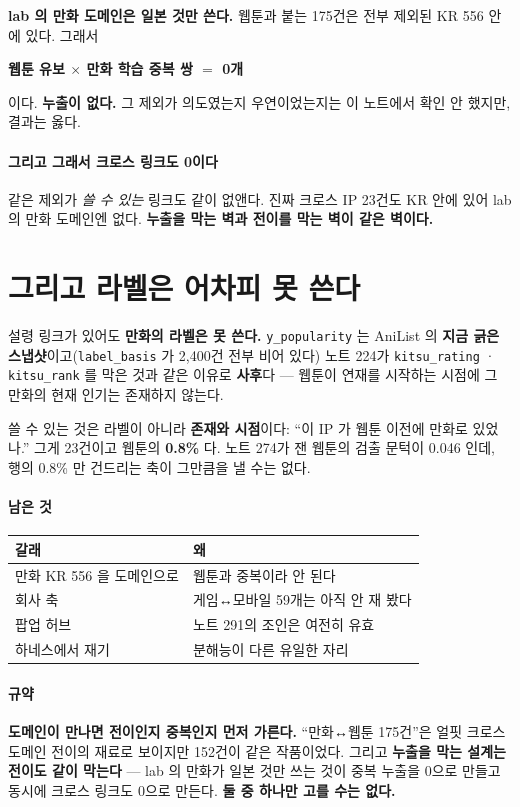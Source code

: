 \documentclass[10pt]{article}
\begin{document}
\textbf{lab 의 만화 도메인은 일본 것만 쓴다.} 웹툰과 붙는 175건은 전부 제외된
KR 556 안에 있다. 그래서

\begin{center}\small
\textbf{웹툰 유보 $\times$ 만화 학습 중복 쌍 ${=}$ 0개}
\end{center}

이다. \textbf{누출이 없다.} 그 제외가 의도였는지 우연이었는지는 이 노트에서
확인 안 했지만, 결과는 옳다.

\paragraph{그리고 그래서 크로스 링크도 0이다} 같은 제외가 \emph{쓸 수 있는}
링크도 같이 없앤다. 진짜 크로스 IP 23건도 KR 안에 있어 lab 의 만화 도메인엔
없다. \textbf{누출을 막는 벽과 전이를 막는 벽이 같은 벽이다.}

\section{그리고 라벨은 어차피 못 쓴다}

설령 링크가 있어도 \textbf{만화의 라벨은 못 쓴다.} \texttt{y\_popularity} 는
AniList 의 \textbf{지금 긁은 스냅샷}이고(\texttt{label\_basis} 가 2,400건
전부 비어 있다) 노트 224가 \texttt{kitsu\_rating} · \texttt{kitsu\_rank} 를
막은 것과 같은 이유로 \textbf{사후}다 --- 웹툰이 연재를 시작하는 시점에 그
만화의 현재 인기는 존재하지 않는다.

쓸 수 있는 것은 라벨이 아니라 \textbf{존재와 시점}이다: ``이 IP 가 웹툰 이전에
만화로 있었나.'' 그게 23건이고 웹툰의 \textbf{0.8\%} 다. 노트 274가 잰 웹툰의
검출 문턱이 0.046 인데, 행의 0.8\% 만 건드리는 축이 그만큼을 낼 수는 없다.

\paragraph{남은 것}
\begin{center}\small
\begin{tabular}{ll}
\hline
갈래 & 왜 \\
\hline
만화 KR 556 을 도메인으로 & 웹툰과 중복이라 안 된다 \\
회사 축 & 게임↔모바일 59개는 아직 안 재 봤다 \\
팝업 허브 & 노트 291의 조인은 여전히 유효 \\
하네스에서 재기 & 분해능이 다른 유일한 자리 \\
\hline
\end{tabular}
\end{center}

\paragraph{규약} \textbf{도메인이 만나면 전이인지 중복인지 먼저 가른다.}
``만화↔웹툰 175건''은 얼핏 크로스 도메인 전이의 재료로 보이지만 152건이 같은
작품이었다. 그리고 \textbf{누출을 막는 설계는 전이도 같이 막는다} ---
lab 의 만화가 일본 것만 쓰는 것이 중복 누출을 0으로 만들고 동시에 크로스
링크도 0으로 만든다. \textbf{둘 중 하나만 고를 수는 없다.}
\end{document}
